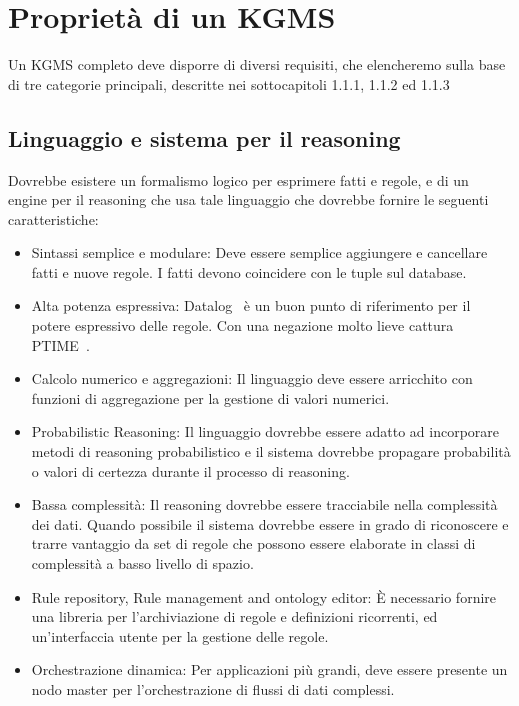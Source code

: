 \section{Proprietà di un KGMS}

Un KGMS completo deve disporre di diversi requisiti, che elencheremo sulla base di tre categorie principali, descritte nei sottocapitoli 1.1.1, 1.1.2 ed 1.1.3

\subsection{Linguaggio e sistema per il reasoning}

Dovrebbe esistere un formalismo logico per esprimere fatti e regole, e di un engine per il reasoning che usa tale linguaggio che dovrebbe fornire le seguenti caratteristiche:
\begin{itemize}
	\item Sintassi semplice e modulare: Deve essere semplice aggiungere e cancellare fatti e nuove regole. I fatti devono coincidere con le tuple sul database.
	\item Alta potenza espressiva: Datalog~\cite{ceri2012logic, huang2011datalog} è un buon punto di riferimento per il potere espressivo delle regole. Con una negazione molto lieve cattura PTIME~\cite{dantsin2001complexity}.
	\item Calcolo numerico e aggregazioni: Il linguaggio deve essere arricchito con funzioni di aggregazione per la gestione di valori numerici.
	\item Probabilistic Reasoning: Il linguaggio dovrebbe essere adatto ad incorporare metodi di reasoning probabilistico e il sistema dovrebbe propagare probabilità o valori di certezza durante il processo di reasoning.
	\item Bassa complessità: Il reasoning dovrebbe essere tracciabile nella complessità dei dati. Quando possibile il sistema dovrebbe essere in grado di riconoscere e trarre vantaggio da set di regole che possono essere elaborate in classi di complessità a basso livello di spazio. 
	\item Rule repository, Rule management and ontology editor: È necessario fornire una libreria per l'archiviazione di regole e definizioni ricorrenti, ed un'interfaccia utente per la gestione delle regole.
	\item Orchestrazione dinamica: Per applicazioni più grandi, deve essere presente un nodo master per l'orchestrazione di flussi di dati complessi.
\end{itemize}

